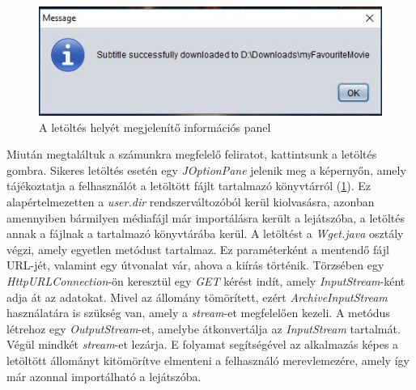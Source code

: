 \begin{spacing}{1.25}
\begin{figure}
  \includegraphics[width=\linewidth]{images/downloaded_sub.jpg}
  \caption{A letöltés helyét megjelenítő információs panel}
  \label{fig:downloaded_sub}
\end{figure}
\end{spacing}

Miután megtaláltuk a számunkra megfelelő feliratot, kattintsunk a letöltés gombra. Sikeres letöltés esetén egy \textit{JOptionPane} jelenik meg a képernyőn, amely tájékoztatja a felhasználót a letöltött fájlt tartalmazó könyvtárról (\ref{fig:downloaded_sub}). Ez alapértelmezetten a \textit{user.dir} rendszerváltozóból kerül kiolvasásra, azonban amennyiben bármilyen médiafájl már importálásra került a lejátszóba, a letöltés annak a fájlnak a tartalmazó könyvtárába kerül.
A letöltést a \textit{Wget.java} osztály végzi, amely egyetlen metódust tartalmaz. Ez paraméterként a mentendő fájl URL-jét, valamint egy útvonalat vár, ahova a kiírás történik. Törzsében egy \textit{HttpURLConnection}-ön keresztül egy \textit{GET} kérést indít, amely \textit{InputStream}-ként adja át az adatokat. Mivel az állomány tömörített, ezért \textit{ArchiveInputStream} használatára is szükség van, amely a \textit{stream}-et megfelelően kezeli. A metódus létrehoz egy \textit{OutputStream}-et, amelybe átkonvertálja az \textit{InputStream} tartalmát. Végül mindkét \textit{stream}-et lezárja. E folyamat segítségével az alkalmazás képes a letöltött állományt kitömörítve elmenteni a felhasználó merevlemezére, amely így már azonnal importálható a lejátszóba.